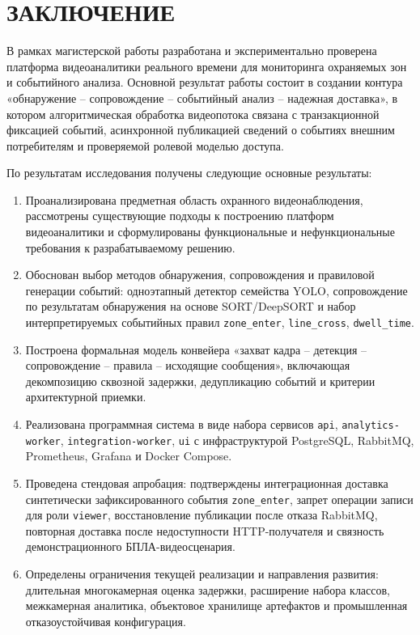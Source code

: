 \chapter*{ЗАКЛЮЧЕНИЕ}

В рамках магистерской работы разработана и экспериментально проверена платформа видеоаналитики реального времени для мониторинга охраняемых зон и событийного анализа. Основной результат работы состоит в создании контура «обнаружение -- сопровождение -- событийный анализ -- надежная доставка», в котором алгоритмическая обработка видеопотока связана с транзакционной фиксацией событий, асинхронной публикацией сведений о событиях внешним потребителям и проверяемой ролевой моделью доступа.

По результатам исследования получены следующие основные результаты:
\begin{enumerate}
    \item Проанализирована предметная область охранного видеонаблюдения, рассмотрены существующие подходы к построению платформ видеоаналитики и сформулированы функциональные и нефункциональные требования к разрабатываемому решению.
    \item Обоснован выбор методов обнаружения, сопровождения и правиловой генерации событий: одноэтапный детектор семейства YOLO, сопровождение по результатам обнаружения на основе SORT/DeepSORT и набор интерпретируемых событийных правил \texttt{zone\_enter}, \texttt{line\_cross}, \texttt{dwell\_time}.
    \item Построена формальная модель конвейера «захват кадра -- детекция -- сопровождение -- правила -- исходящие сообщения», включающая декомпозицию сквозной задержки, дедупликацию событий и критерии архитектурной приемки.
    \item Реализована программная система в виде набора сервисов \texttt{api}, \texttt{analytics-worker}, \texttt{integration-worker}, \texttt{ui} с инфраструктурой PostgreSQL, RabbitMQ, Prometheus, Grafana и Docker Compose.
    \item Проведена стендовая апробация: подтверждены интеграционная доставка синтетически зафиксированного события \texttt{zone\_enter}, запрет операции записи для роли \texttt{viewer}, восстановление публикации после отказа RabbitMQ, повторная доставка после недоступности HTTP-получателя и связность демонстрационного БПЛА-видеосценария.
    \item Определены ограничения текущей реализации и направления развития: длительная многокамерная оценка задержки, расширение набора классов, межкамерная аналитика, объектовое хранилище артефактов и промышленная отказоустойчивая конфигурация.
\end{enumerate}

